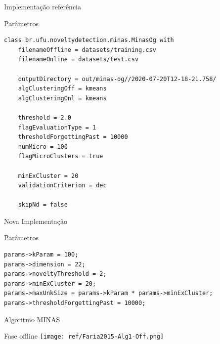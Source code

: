 \documentclass[aspectratio=43,10pt]{beamer}
\begin{document}
\begin{frame}[fragile]{Implementação referência}
  \begin{alertblock}{Parâmetros}
    \begin{Verbatim}[fontsize=\footnotesize]
class br.ufu.noveltydetection.minas.MinasOg with
	filenameOffline = datasets/training.csv
	filenameOnline = datasets/test.csv

	outputDirectory = out/minas-og//2020-07-20T12-18-21.758/
	algClusteringOff = kmeans
	algClusteringOnl = kmeans

	threshold = 2.0
	flagEvaluationType = 1
	thresholdForgettingPast = 10000
	numMicro = 100
	flagMicroClusters = true

	minExCluster = 20
	validationCriterion = dec

	skipNd = false
    \end{Verbatim}
  \end{alertblock}
\end{frame}
\begin{frame}[fragile]{Nova Implementação}
  \begin{alertblock}{Parâmetros}
    \begin{Verbatim}[fontsize=\small]
params->kParam = 100;
params->dimension = 22;
params->noveltyThreshold = 2;
params->minExCluster = 20;
params->maxUnkSize = params->kParam * params->minExCluster;
params->thresholdForgettingPast = 10000;
    \end{Verbatim}
  \end{alertblock}
\end{frame}

\begin{frame}[fragile]{Algoritmo MINAS}
  \begin{alertblock}{Fase offline}
    \texttt{[image: ref/Faria2015-Alg1-Off.png]}
  \end{alertblock}
\end{frame}
\end{document}
